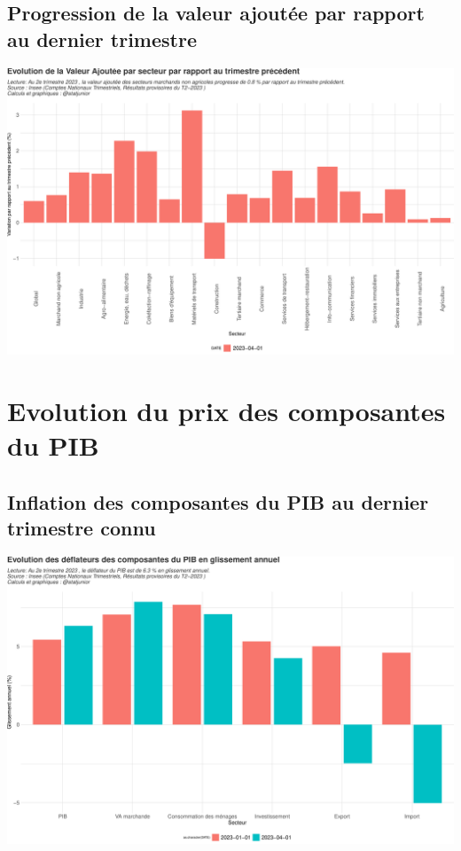 \documentclass[
  paper=a4,
  ,captions=tableheading
]{scrartcl}
\begin{document}
\hypertarget{progression-de-la-valeur-ajoutuxe9e-par-rapport-au-dernier-trimestre}{%
\subsection{Progression de la valeur ajoutée par rapport au dernier
trimestre}\label{progression-de-la-valeur-ajoutuxe9e-par-rapport-au-dernier-trimestre}}

\includegraphics{rapport_pdf_compte_branche_files/figure-latex/unnamed-chunk-5-1.pdf}

\hypertarget{evolution-du-prix-des-composantes-du-pib}{%
\section{Evolution du prix des composantes du
PIB}\label{evolution-du-prix-des-composantes-du-pib}}

\hypertarget{inflation-des-composantes-du-pib-au-dernier-trimestre-connu}{%
\subsection{Inflation des composantes du PIB au dernier trimestre
connu}\label{inflation-des-composantes-du-pib-au-dernier-trimestre-connu}}

\includegraphics{rapport_pdf_compte_branche_files/figure-latex/unnamed-chunk-6-1.pdf}
\end{document}
